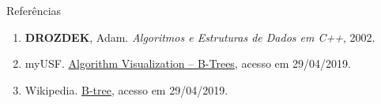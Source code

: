 \begin{frame}[fragile]{Referências}

    \begin{enumerate}
        \item \textbf{DROZDEK}, Adam. \textit{Algoritmos e Estruturas de Dados em C++}, 2002.

        \item myUSF. \href{https://www.cs.usfca.edu/~galles/visualization/BTree.html}{Algorithm Visualization -- B-Trees}, acesso em 29/04/2019.

        \item Wikipedia. \href{https://en.wikipedia.org/wiki/B-tree}{B-tree}, acesso em 29/04/2019.

    \end{enumerate}

\end{frame}
